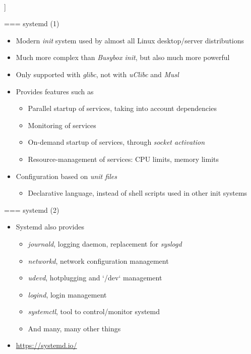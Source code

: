   \\]

=== {systemd (1)}
  \begin{itemize}
  \item Modern {\em init} system used by almost all Linux
    desktop/server distributions
  \item Much more complex than {\em Busybox init}, but also much more
    powerful
  \item Only supported with {\em glibc}, not with {\em uClibc} and {\em Musl}
  \item Provides features such as
    \begin{itemize}
    \item Parallel startup of services, taking into account
      dependencies
    \item Monitoring of services
    \item On-demand startup of services, through {\em socket
        activation}
    \item Resource-management of services: CPU limits, memory limits
    \end{itemize}
  \item Configuration based on {\em unit files}
    \begin{itemize}
    \item Declarative language, instead of shell scripts used in other
      init systems
    \end{itemize}
  \end{itemize}


=== {systemd (2)}
  \begin{itemize}
  \item Systemd also provides
    \begin{itemize}
    \item {\em journald}, logging daemon, replacement for {\em syslogd}
    \item {\em networkd}, network configuration management
    \item {\em udevd}, hotplugging and `/dev` management
    \item {\em logind}, login management
    \item {\em systemctl}, tool to control/monitor systemd
    \item And many, many other things
    \end{itemize}
  \item \url{https://systemd.io/}
  \end{itemize}



